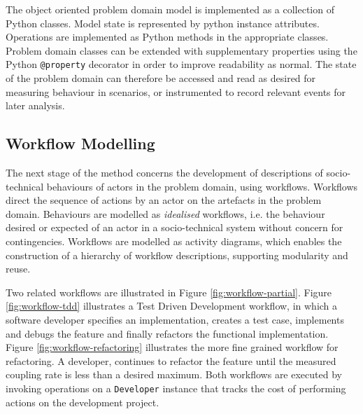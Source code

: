 \documentclass{sig-alternate}
\begin{document}
The object oriented problem domain model is implemented as a collection of
Python classes.  Model state is represented by python instance attributes.
Operations are implemented as Python methods in the appropriate classes.
Problem domain classes can be extended with supplementary properties using the
Python \lstinline!@property! decorator in order to improve readability as
normal.  The state of the problem domain can therefore be accessed and read as
desired for measuring behaviour in scenarios, or instrumented to record relevant
events for later analysis.


\subsection{Workflow Modelling}


The next stage of the method concerns the development of descriptions of
socio-technical behaviours of actors in the problem domain, using workflows.
Workflows direct the sequence of actions by an actor on the artefacts in the
problem domain.  Behaviours are modelled as \emph{idealised} workflows,
i.e. the behaviour desired or expected of an actor in a socio-technical system
without concern for contingencies.  Workflows are modelled as activity diagrams,
which enables the construction of a hierarchy of workflow descriptions,
supporting modularity and reuse.

Two related workflows are illustrated in Figure \ref{fig:workflow-partial}.
Figure \ref{fig:workflow-tdd} illustrates a Test Driven Development workflow, in
which a software developer specifies an implementation, creates a test case,
implements and debugs the feature and finally refactors the functional
implementation.  Figure \ref{fig:workflow-refactoring} illustrates the more fine
grained workflow for refactoring.  A developer, continues to refactor the
feature until the measured coupling rate is less than a desired maximum.  Both
workflows are executed by invoking operations on a \lstinline!Developer!
instance that tracks the cost of performing actions on the development project.
\end{document}
